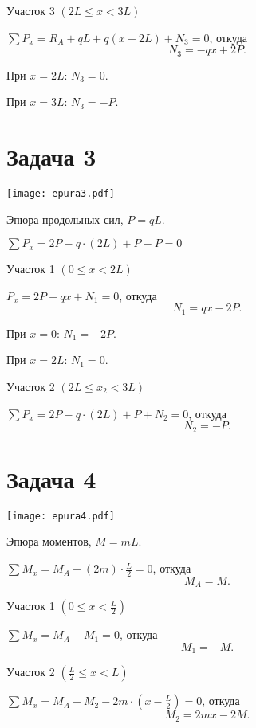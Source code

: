 Участок 3 $\left(2L \le x < 3L\right)$

$\sum P_{x} = R_A + qL + q (x - 2L) + N_3 = 0$,
откуда
\[
    N_3 = -qx + 2P.
\]

При $x = 2L$: $N_3 = 0$.

При $x = 3L$: $N_3 = -P$.

\newpage


\section{Задача 3}

\begin{floatingfigure}[r]{0.5\textwidth}
    \centering
    \texttt{[image: epura3.pdf]}
    \caption{Эпюра продольных сил, $P = qL$.}
    \label{fig:chap1-epura3}
\end{floatingfigure}

$\sum P_x = 2P - q \cdot \left(2L\right) + P - P = 0$

Участок 1 $\left(0 \le x < 2L\right)$

$P_x = 2P - qx + N_1 = 0$,
откуда
\[
    N_1 = qx - 2P.
\]

При $x = 0$: $N_1 = -2 P$.

При $x = 2L$: $N_1 = 0$.

Участок 2 $\left(2L \le x_2 < 3L\right)$

$\sum P_x = 2P - q \cdot \left(2L\right) + P + N_2 = 0$,
откуда
\[
    N_2 = -P.
\]

\newpage


\section{Задача 4}

\begin{floatingfigure}[r]{0.5\textwidth}
    \centering
    \texttt{[image: epura4.pdf]}
    \caption{Эпюра моментов, $M = mL$.}
    \label{fig:chap1-epura4}
\end{floatingfigure}

$\sum M_x = M_A - \left(2m\right) \cdot \frac{L}{2} = 0$,
откуда
\[
    M_A = M.
\]

Участок 1 $\left(0 \le x < \frac{L}{2}\right)$

$\sum M_x = M_A + M_1 = 0$,
откуда
\[
    M_1 = -M.
\]

Участок 2 $ \left(\frac{L}{2} \le x < L\right)$

$\sum M_x = M_A + M_2 - 2m \cdot \left(x - \frac{L}{2}\right) = 0$,
откуда
\[
    M_2 = 2mx - 2M.
\]

